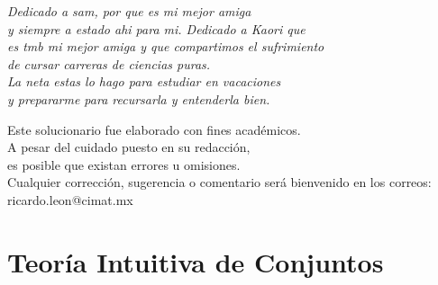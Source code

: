 \documentclass[12pt,a4paper]{book}
\begin{document}
    
    
    \thispagestyle{empty}
    

    \begin{flushright}
      \thispagestyle{empty}

        \textit{Dedicado a sam, por que es mi mejor amiga\\
        y siempre a estado ahi para mi. Dedicado a Kaori que\\
        es tmb mi mejor amiga y que compartimos el sufrimiento\\
        de cursar carreras de ciencias puras.}\\[1cm]

        \textit{La neta estas lo hago para estudiar en vacaciones\\
        y prepararme para recursarla y entenderla bien.}\\[1.2cm]

    \end{flushright}


    \cleardoublepage
    \thispagestyle{empty}

    \begin{mdframed}[style=mdgreenbox]
        \begin{center}
        \small
        Este solucionario fue elaborado con fines académicos.\\
        A pesar del cuidado puesto en su redacción,\\
        es posible que existan errores u omisiones.\\[0.3cm]

        Cualquier corrección, sugerencia o comentario será bienvenido
        en los correos: \\[0.3cm]

        
        ricardo.leon@cimat.mx
        \end{center}
    \end{mdframed}

    
    \setcounter{page}{1}
    \tableofcontents

    \chapter{Teoría Intuitiva de Conjuntos}
\end{document}
